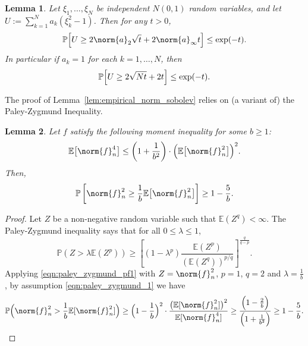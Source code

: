 \documentclass[twoside]{article}
\newcommand{\1}{\mathbf{1}}
\newcommand{\Pbb}{\mathbb{P}}
\newcommand{\Ebb}{\mathbb{E}}
\newtheorem{lemma}{Lemma}
\theoremstyle{definition}
\theoremstyle{remark}
\begin{document}
\label{sec:concentration}
\begin{lemma}
	\label{lem:chi_square_bound}
	Let $\xi_1,\ldots,\xi_N$ be independent $N(0,1)$ random variables, and let $U := \sum_{k = 1}^{N} a_k(\xi_k^2 - 1)$.  Then for any $t > 0$,
	\begin{equation*}
	\Pbb\Bigl[U \geq 2 \norm{a}_2 \sqrt{t} + 2 \norm{a}_{\infty}t\Bigr] \leq \exp(-t).
	\end{equation*}
	In particular if $a_k = 1$ for each $k = 1,\ldots,N$, then
	\begin{equation*}
	\Pbb\Bigl[U\geq 2\sqrt{N t} + 2t\Bigr] \leq \exp(-t).
	\end{equation*}
\end{lemma}

The proof of Lemma~\ref{lem:empirical_norm_sobolev} relies on (a variant of) the Paley-Zygmund Inequality.
\begin{lemma}
	\label{lem:paley_zygmund}
	Let $f$ satisfy the following moment inequality for some $b \geq 1$:
	\begin{equation}
	\label{eqn:paley_zygmund_1}
	\Ebb\bigl[\norm{f}_n^4\bigr] \leq \left(1 + \frac{1}{b^2}\right)\cdot\Bigl(\Ebb\bigl[\norm{f}_n^2\bigr]\Bigr)^2.
	\end{equation}
	Then,
	\begin{equation}
	\label{eqn:paley_zygmund_2}
	\mathbb{P}\left[\norm{f}_n^2 \geq \frac{1}{b} \Ebb\bigl[\norm{f}_n^2\bigr]\right] \geq 1 - \frac{5}{b}.
	\end{equation}
\end{lemma}
\begin{proof}
	Let $Z$ be a non-negative random variable such that $\mathbb{E}(Z^q) < \infty$. The Paley-Zygmund inequality says that for all $0 \leq \lambda \leq 1$,
	\begin{equation}
	\label{eqn:paley_zygmund_pf1}
	\mathbb{P}(Z > \lambda \mathbb{E}(Z^p)) \geq \left[(1 - \lambda^p) \frac{\mathbb{E}(Z^p)}{(\mathbb{E}(Z^q))^{p/q}}\right]^{\frac{q}{q - p}}.
	\end{equation}
	Applying \eqref{eqn:paley_zygmund_pf1} with $Z = \norm{f}_n^2$, $p = 1$, $q = 2$ and $\lambda = \frac{1}{b}$, by assumption \eqref{eqn:paley_zygmund_1} we have
	\begin{equation*}
	\mathbb{P}\Bigl(\norm{f}_n^2 > \frac{1}{b} \mathbb{E}[\norm{f}_n^2]\Bigr) \geq \Bigl(1 - \frac{1}{b}\Bigr)^2 \cdot  \frac{\bigl(\mathbb{E}[\norm{f}_n^2]\bigr)^2}{\mathbb{E}[\norm{f}_n^4]} \geq \frac{\Bigl(1 - \frac{2}{b}\Bigr)}{\Bigl(1 + \frac{1}{b^2}\Bigr)} \geq 1 - \frac{5}{b}.
	\end{equation*}
\end{proof}
\end{document}
